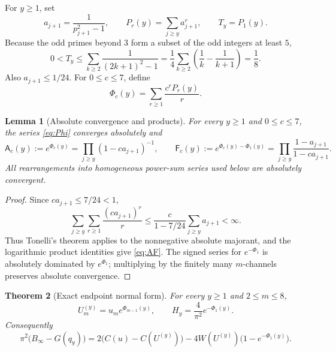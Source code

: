 \documentclass[11pt]{article}
\newtheorem{theorem}{Theorem}[section]
\newtheorem{lemma}[theorem]{Lemma}
\theoremstyle{definition}
\theoremstyle{remark}
\newcommand{\Afun}{\mathsf A}
\newcommand{\Ffun}{\mathsf F}
\begin{document}
For $y\ge1$, set
\begin{equation}
 a_{j+1}=\frac1{p_{j+1}^2-1},\qquad
 P_r(y)=\sum_{j\ge y}a_{j+1}^r,\qquad
 T_y=P_1(y).
 \label{eq:power-sums}
\end{equation}
Because the odd primes beyond $3$ form a subset of the odd integers at
least $5$,
\begin{equation}
 0<T_y\le\sum_{k\ge2}\frac1{(2k+1)^2-1}
 =\frac14\sum_{k\ge2}\left(\frac1k-\frac1{k+1}\right)=\frac18.
 \label{eq:T-bound}
\end{equation}
Also $a_{j+1}\le1/24$.  For $0\le c\le7$, define
\begin{equation}
 \Phi_c(y)=\sum_{r\ge1}\frac{c^rP_r(y)}r.
 \label{eq:Phi}
\end{equation}

\begin{lemma}[Absolute convergence and products]
\label{lem:absolute}
For every $y\ge1$ and $0\le c\le7$, the series \eqref{eq:Phi} converges
absolutely and
\begin{equation}
 \Afun_c(y):=e^{\Phi_c(y)}
 =\prod_{j\ge y}(1-ca_{j+1})^{-1},
 \qquad
 \Ffun_c(y):=e^{\Phi_c(y)-\Phi_1(y)}
 =\prod_{j\ge y}\frac{1-a_{j+1}}{1-ca_{j+1}}.
 \label{eq:AF}
\end{equation}
All rearrangements into homogeneous power-sum series used below are
absolutely convergent.
\end{lemma}

\begin{proof}
Since $ca_{j+1}\le7/24<1$,
\[
 \sum_{j\ge y}\sum_{r\ge1}\frac{(ca_{j+1})^r}{r}
 \le \frac{c}{1-7/24}\sum_{j\ge y}a_{j+1}<\infty.
\]
Thus Tonelli's theorem applies to the nonnegative absolute majorant, and
the logarithmic product identities give \eqref{eq:AF}.  The signed series
for $e^{-\Phi_1}$ is absolutely dominated by $e^{\Phi_1}$; multiplying by
the finitely many $m$-channels preserves absolute convergence.
\end{proof}

\begin{theorem}[Exact endpoint normal form]
\label{thm:endpoint}
For every $y\ge1$ and $2\le m\le8$,
\begin{equation}
 U_m^{(y)}=u_m e^{\Phi_{m-1}(y)},
 \qquad H_y=\frac4{\pi^2}e^{-\Phi_1(y)}.
 \label{eq:ratio-H}
\end{equation}
Consequently
\begin{equation}
 \boxed{\;
 \pi^2\bigl(B_\infty-G(q_y)\bigr)
 =2\bigl(C(u)-C(U^{(y)})\bigr)
  -4W(U^{(y)})\bigl(1-e^{-\Phi_1(y)}\bigr).\;}
 \label{eq:normal-form}
\end{equation}
\end{theorem}
\end{document}
